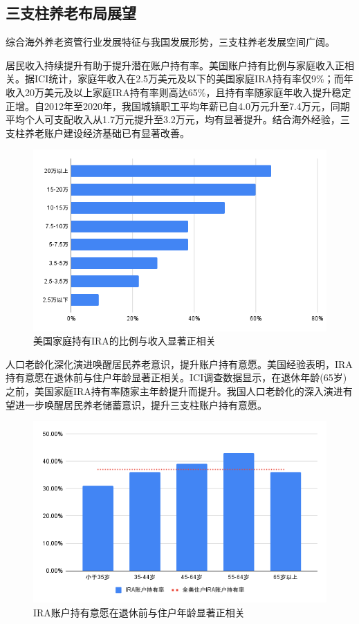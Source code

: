 \documentclass[a4paper,zihao=5]{ctexart}
\begin{document}
\subsection{三支柱养老布局展望}
综合海外养老资管行业发展特征与我国发展形势，三支柱养老发展空间广阔。

居民收入持续提升有助于提升潜在账户持有率。美国账户持有比例与家庭收入正相关。据ICI统计，家庭年收入在2.5万美元及以下的美国家庭IRA持有率仅9\%；而年收入20万美元及以上家庭IRA持有率则高达65\%，且持有率随家庭年收入提升稳定正增。自2012年至2020年，我国城镇职工平均年薪已自4.0万元升至7.4万元，同期平均个人可支配收入从1.7万元提升至3.2万元，均有显著提升。结合海外经验，三支柱养老账户建设经济基础已有显著改善。
\begin{figure}[H]
    \includegraphics[width=\linewidth]{img/美国家庭持有IRA的比例与收入显著正相关.png}
    \caption{美国家庭持有IRA的比例与收入显著正相关}
\end{figure}

人口老龄化深化演进唤醒居民养老意识，提升账户持有意愿。美国经验表明，IRA持有意愿在退休前与住户年龄显著正相关。ICI调查数据显示，在退休年龄(65岁)之前，美国家庭IRA持有率随家主年龄提升而提升。我国人口老龄化的深入演进有望进一步唤醒居民养老储蓄意识，提升三支柱账户持有意愿。
\begin{figure}[H]
    \centering
    \includegraphics[width=\linewidth]{img/IRA账户持有率和全美住户IRA账户持有率.png}
    \caption{IRA账户持有意愿在退休前与住户年龄显著正相关}
\end{figure}
\end{document}
